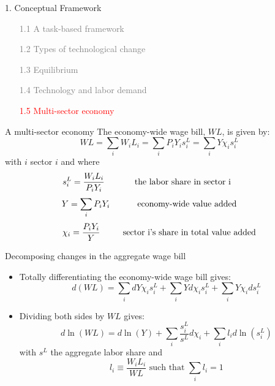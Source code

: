 \documentclass[notes=show]{beamer}
\begin{document}
\begin{frame}{1. Conceptual Framework}
\begin{itemize}
\item[\textcolor{gray}{1.1}] \textcolor{gray}{A task-based framework} \bigskip
\item[\textcolor{gray}{1.2}] \textcolor{gray}{Types of technological change} \bigskip
\item[\textcolor{gray}{1.3}] \textcolor{gray}{Equilibrium} \bigskip
\item[\textcolor{gray}{1.4}] \textcolor{gray}{Technology and labor demand} \bigskip
\item[\textcolor{red}{1.5}] \textcolor{red}{Multi-sector economy} 
\end{itemize}
\end{frame}

\begin{frame}{A multi-sector economy}
The economy-wide wage bill, $WL$, is given by:
\[
WL = \sum_{i} W_{i} L_{i} = \sum_{i} P_{i} Y_{i} s_{i}^{L} = \sum_{i } Y \chi_{i} s_{i}^{L}
\]
with $i$ sector $i$ and where 
\[
s_{i}^{L} = \frac{W_{i}L_{i}}{P_{i}Y_{i}} \text{ \hspace{1cm} the labor share in sector i \hspace{0.9cm}}
\]
\[
Y = \sum_{i}  P_{i} Y_{i} \text{ \hspace{0.9cm} economy-wide value added \hspace{0.7cm}}
\]
\[
\chi_{i} = \frac{P_{i}Y_{i}}{Y} \text{ \hspace{0.7cm} sector i's share in total value added}
\]
\end{frame}

\begin{frame}{Decomposing changes in the aggregate wage bill}
\begin{itemize}
\item Totally differentiating the economy-wide wage bill gives:
\[
d(WL) = \sum_{i} dY \chi_{i} s_{i}^{L} + \sum_{i} Y d\chi_{i} s_{i}^{L} + \sum_{i} Y \chi_{i} ds_{i}^{L}
\]
\item Dividing both sides by $WL$ gives:
\[
d \ln (WL) = d \ln (Y) + \sum_{i} \frac{s_{i}^{L}}{s^{L}} d \chi_{i} + \sum_{i} l_{i} d \ln (s_{i}^{L})
\]
with $s^{L}$ the aggregate labor share and 
\[
l_{i} \equiv \frac{W_{i}L_{i}}{WL} \text{   such that   } \sum_{i} l_{i} = 1
\]
\end{itemize}
\end{frame}
\end{document}
